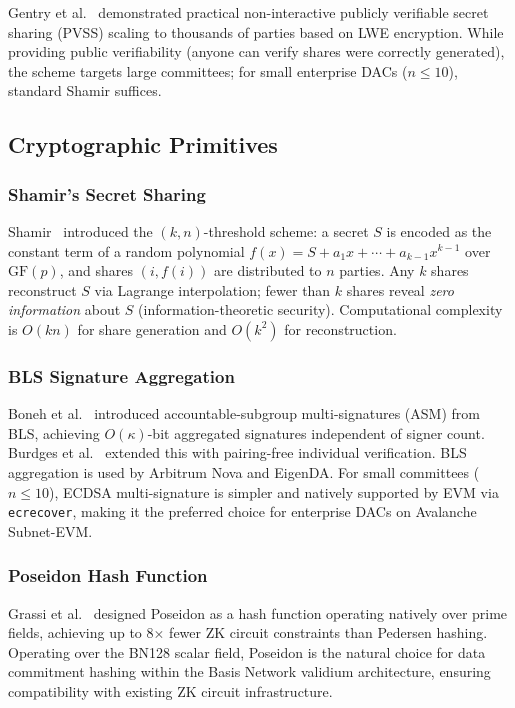 Gentry et al.~\cite{gentry2022pvss} demonstrated practical non-interactive
publicly verifiable secret sharing (PVSS) scaling to thousands of parties
based on LWE encryption. While providing public verifiability (anyone can
verify shares were correctly generated), the scheme targets large committees;
for small enterprise DACs ($n \leq 10$), standard Shamir suffices.

\subsection{Cryptographic Primitives}

\subsubsection{Shamir's Secret Sharing}

Shamir~\cite{shamir1979share} introduced the $(k,n)$-threshold scheme:
a secret $S$ is encoded as the constant term of a random polynomial
$f(x) = S + a_1 x + \cdots + a_{k-1} x^{k-1}$ over $\mathrm{GF}(p)$,
and shares $(i, f(i))$ are distributed to $n$ parties. Any $k$ shares
reconstruct $S$ via Lagrange interpolation; fewer than $k$ shares reveal
\emph{zero information} about $S$ (information-theoretic security).
Computational complexity is $O(kn)$ for share generation and $O(k^2)$
for reconstruction.

\subsubsection{BLS Signature Aggregation}

Boneh et al.~\cite{boneh2018compact} introduced accountable-subgroup
multi-signatures (ASM) from BLS, achieving $O(\kappa)$-bit aggregated
signatures independent of signer count. Burdges et
al.~\cite{burdges2022aggregatable} extended this with pairing-free
individual verification. BLS aggregation is used by Arbitrum Nova and
EigenDA. For small committees ($n \leq 10$), ECDSA multi-signature is
simpler and natively supported by EVM via \texttt{ecrecover}, making it
the preferred choice for enterprise DACs on Avalanche Subnet-EVM.

\subsubsection{Poseidon Hash Function}

Grassi et al.~\cite{grassi2021poseidon} designed Poseidon as a hash
function operating natively over prime fields, achieving up to 8$\times$
fewer ZK circuit constraints than Pedersen hashing. Operating over the
BN128 scalar field, Poseidon is the natural choice for data commitment
hashing within the Basis Network validium architecture, ensuring
compatibility with existing ZK circuit infrastructure.
